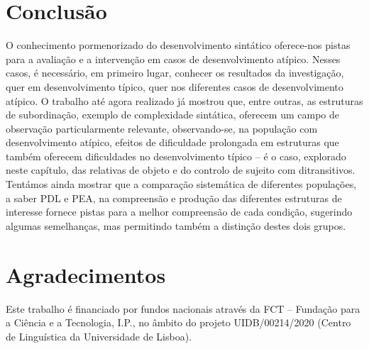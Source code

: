 \documentclass[output=paper,colorlinks,citecolor=brown,booklanguage=portuguese]{langscibook}
\begin{document}
\section{Conclusão}
O conhecimento pormenorizado do desenvolvimento sintático oferece-nos pistas para a avaliação e a intervenção em casos de desenvolvimento atípico. Nesses casos, é necessário, em primeiro lugar, conhecer os resultados da investigação, quer em desenvolvimento típico, quer nos diferentes casos de desenvolvimento atípico. O trabalho até agora realizado já mostrou que, entre outras, as estruturas de subordinação, exemplo de complexidade sintática, oferecem um campo de observação particularmente relevante, observando-se, na população com desenvolvimento atípico, efeitos de dificuldade prolongada em estruturas que também oferecem dificuldades no desenvolvimento típico – é o caso, explorado neste capítulo, das relativas de objeto e do controlo de sujeito com ditransitivos. Tentámos ainda mostrar que a comparação sistemática de diferentes populações, a saber PDL e PEA, na compreensão e produção das diferentes estruturas de interesse fornece pistas para a melhor compreensão de cada condição, sugerindo algumas semelhanças, mas permitindo também a distinção destes dois grupos.

\section*{Agradecimentos}
Este trabalho é financiado por fundos nacionais através da FCT – Fundação para a Ciência e a Tecnologia, I.P., no âmbito do projeto UIDB/00214/2020 (Centro de Linguística da Universidade de Lisboa).


{\sloppy\printbibliography[heading=subbibliography,notkeyword=this]}
\end{document}
